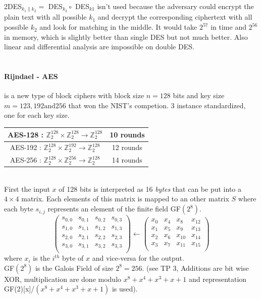 \documentclass[11pt,a4paper]{report}
\begin{document}
2DES$_{k_1 \parallel k_2 } = $ DES$_{k_2} \circ $ DES$_{k1}$ isn't used because the adversary could encrypt the plain text with all possible $k_1$ and decrypt the corresponding ciphertext with all possible $k_2$ and look for matching in the middle. It would take $2^{57}$ in time and $2^56$ in memory, which is slightly better than single DES but not much better. Also linear and differential analysis are impossible on double DES.\\
\\

\paragraph{Rijndael - AES} is a new type of block ciphers with block size $n = 128$ bits and key size $m = 123, 192 \text{and} 256$ that won the NIST's competion. 3 instance standardized, one for each key size.\\
\begin{tabular}{|c|c|}
\hline
AES-128 : $\mathbb{Z}_2^{128} \times \mathbb{Z}_2^{128} \rightarrow \mathbb{Z}_2^{128}$ & 10 rounds\\
\hline
AES-192 : $\mathbb{Z}_2^{128} \times \mathbb{Z}_2^{192} \rightarrow \mathbb{Z}_2^{128}$ & 12 rounds\\
\hline
AES-256 : $\mathbb{Z}_2^{128} \times \mathbb{Z}_2^{256} \rightarrow \mathbb{Z}_2^{128}$ & 14 rounds\\
\hline
\end{tabular}\\

First the input $x$ of 128 bits is interpreted as 16 \emph{bytes} that can be put into a $4 \times 4$ matrix. Each elements of this matrix is mapped to an other matrix $S$ where each byte $s_{i,j}$ represents an element of the finite field GF$(2^8)$.\\
$$\left(\begin{array}{cccc}
s_{0,0} & s_{0,1} & s_{0,2} & s_{0,3}\\
s_{1,0} & s_{1,1} & s_{1,2} & s_{1,3}\\
s_{2,0} & s_{2,1} & s_{2,2} & s_{2,3}\\
s_{3,0} & s_{3,1} & s_{3,2} & s_{3,3}\\
\end{array}\right) \leftarrow
\left(\begin{array}{cccc}
x_0 & x_4 & x_8 & x_{12} \\
x_1 & x_5 & x_9 & x_{13} \\
x_2 & x_6 & x_{10} & x_{14} \\
x_3 & x_7 & x_{11} & x_{15} \\
\end{array}\right)$$
where $x_i$ is the $i^{th}$ byte of $x$ and vice-versa for the output.\\
GF$(2^8)$ is the Galois Field of size $2^8 = 256$. (see TP 3, Additions are bit wise XOR, multiplication are done modulo $x^8 + x^4 + x^3 + x + 1$ and representation GF(2)[x]/$(x^8 + x^4 + x^3 + x + 1)$ is used).
\end{document}
